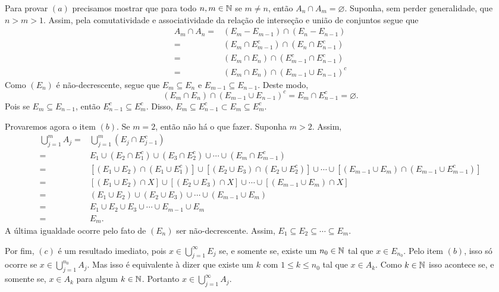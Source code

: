 \begin{prova}
    Para provar $(a)$ precisamos mostrar que para todo $n,m \in \operatorname{\mathbb{N}}$ se $m \neq n$, então $A_n \cap A_m = \varnothing$.
    Suponha, sem perder generalidade, que $n > m > 1$.
    Assim, pela comutatividade e associatividade da relação de interseção e união de conjuntos segue que
    \begin{align*}
        A_m\cap A_n =& (E_m - E_{m -1}) \cap (E_n - E_{n -1})\\
        =& (E_m \cap E_{m -1}^c) \cap (E_n \cap E_{n -1}^c)\\
        =& (E_m \cap E_n) \cap ( E_{m -1}^c\cap E_{n -1}^c)\\
        =& (E_m \cap E_n) \cap \left( E_{m -1}\cup E_{n -1}\right)^c
    \end{align*}
	Como $(E_n)$ é não-decrescente, segue que $E_m \subseteq E_n$ e $E_{m-1}\subseteq E_{n-1}$.
    Deste modo, 
    $$
    (E_m \cap E_n) \cap \left( E_{m -1}\cup E_{n -1}\right)^c
    =
    E_m \cap E_{n-1}^c
    = \varnothing.
    $$
	Pois se $E_{m} \subseteq E_{n-1}$, então $E_{n-1}^c \subseteq E_{m}^c$.
	Disso, $E_{m} \subseteq E_{n-1}^c \subset E_{m} \subseteq E_{m}^c$.
    
    Provaremos agora o item $(b)$.
 	Se $m = 2$, então não há o que fazer.
 	Suponha $m > 2$.
 	Assim, 
 	\begin{align*}
 		\bigcup_{j = 1}^m A_j
 		=&
 		\bigcup_{j = 1}^m(E_j\cap E_{j-1}^c)\\
 		=&
 		E_1 \cup (E_2\cap E_{1}^c) \cup (E_3\cap E_{2}^c) \cup \cdots
 		\cup (E_m\cap E_{m-1}^c)\\
 		=&
 		\left[(E_1 \cup E_2)\cap (E_1\cup E_{1}^c)\right]
 		\cup
 		\left[(E_2 \cup E_3)\cap (E_2\cup E_{2}^c)\right]
 		\cup
 		\cdots
 		\cup 
 		\left[(E_{m-1} \cup E_m)\cap (E_{m-1}\cup E_{m-1}^c)\right]\\
 		=&
 		\left[(E_1 \cup E_2)\cap X\right]
 		\cup
 		\left[(E_2 \cup E_3)\cap X\right]
 		\cup
 		\cdots
 		\cup 
 		\left[(E_{m-1} \cup E_m)\cap X\right]\\
 		=&
 		(E_1 \cup E_2)
 		\cup
 		(E_2 \cup E_3)
 		\cup
 		\cdots
 		\cup 
 		(E_{m-1} \cup E_m)\\
 		=&
 		E_1 \cup E_2 \cup E_3\cup 
 		\cdots
 		\cup E_{m-1} \cup E_m\\
 		=& E_m.
 	\end{align*}
	A última igualdade ocorre pelo fato de $(E_n)$ ser não-decrescente.
	Assim, $E_1 \subseteq E_2 \subseteq \cdots \subseteq E_m$.
	
    Por fim, $(c)$ é um resultado imediato, pois $ x \in \displaystyle \bigcup_{j = 1}^\infty E_j$ se, e somente se, 
    existe um $n_0 \in \operatorname{\mathbb{N}}$ tal que $x \in E_{n_0}$. 
    Pelo item $(b)$, isso só ocorre se $x \in \displaystyle \bigcup_{j = 1}^{n_0}A_j$.
    Mas isso é equivalente à dizer que existe um $k$ com $1\leq k\leq n_0$ tal que $x \in A_k$.
    Como $k \in \operatorname{\mathbb{N}}$ isso acontece se, e somente se, $x \in A_k$ para algum $k \in \operatorname{\mathbb{N}}$.
    Portanto $x \in \displaystyle \bigcup_{j = 1}^\infty A_j$.
\end{prova}

